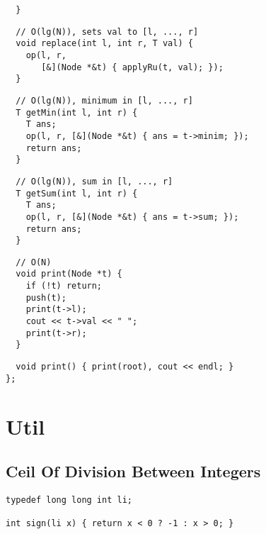 \documentclass[twoside]{article}
\begin{document}
\begin{multicols*}{2}
\begin{verbatim}
  }
\end{verbatim}
\vspace{-12pt}
\begin{verbatim}
  // O(lg(N)), sets val to [l, ..., r]
  void replace(int l, int r, T val) {
    op(l, r,
       [&](Node *&t) { applyRu(t, val); });
  }
\end{verbatim}
\vspace{-12pt}
\begin{verbatim}
  // O(lg(N)), minimum in [l, ..., r]
  T getMin(int l, int r) {
    T ans;
    op(l, r, [&](Node *&t) { ans = t->minim; });
    return ans;
  }
\end{verbatim}
\vspace{-12pt}
\begin{verbatim}
  // O(lg(N)), sum in [l, ..., r]
  T getSum(int l, int r) {
    T ans;
    op(l, r, [&](Node *&t) { ans = t->sum; });
    return ans;
  }
\end{verbatim}
\vspace{-12pt}
\begin{verbatim}
  // O(N)
  void print(Node *t) {
    if (!t) return;
    push(t);
    print(t->l);
    cout << t->val << " ";
    print(t->r);
  }
\end{verbatim}
\vspace{-12pt}
\begin{verbatim}
  void print() { print(root), cout << endl; }
};
\end{verbatim}

\sectionfont{\bfseries\sffamily\centering\Huge}
\vspace{1em}
\section*{Util}
\vspace{3em}
\subsectionfont{\large\bfseries\sffamily\underline}
\subsection*{Ceil Of Division Between Integers}
\begin{verbatim}
typedef long long int li;

int sign(li x) { return x < 0 ? -1 : x > 0; }


\end{verbatim}
\end{multicols*}
\end{document}

